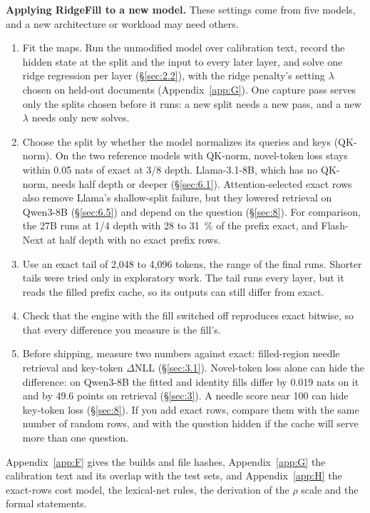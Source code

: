 \documentclass[11pt]{article}
\begin{document}
\textbf{Applying RidgeFill to a new model.} These settings come from five models, and a new architecture or workload may need others.

\begin{enumerate}[leftmargin=*,itemsep=2pt,topsep=4pt]
\item Fit the maps. Run the unmodified model over calibration text, record the hidden state at the split and the input to every later layer, and solve one ridge regression per layer (\S\ref{sec:2.2}), with the ridge penalty's setting $\lambda$ chosen on held-out documents (Appendix~\ref{app:G}). One capture pass serves only the splits chosen before it runs: a new split needs a new pass, and a new $\lambda$ needs only new solves.
\item Choose the split by whether the model normalizes its queries and keys (QK-norm). On the two reference models with QK-norm, novel-token loss stays within 0.05 nats of exact at 3/8 depth. Llama-3.1-8B, which has no QK-norm, needs half depth or deeper (\S\ref{sec:6.1}). Attention-selected exact rows also remove Llama's shallow-split failure, but they lowered retrieval on Qwen3-8B (\S\ref{sec:6.5}) and depend on the question (\S\ref{sec:8}). For comparison, the 27B runs at 1/4 depth with 28 to 31~\% of the prefix exact, and Flash-Next at half depth with no exact prefix rows.
\item Use an exact tail of 2,048 to 4,096 tokens, the range of the final runs. Shorter tails were tried only in exploratory work. The tail runs every layer, but it reads the filled prefix cache, so its outputs can still differ from exact.
\item Check that the engine with the fill switched off reproduces exact bitwise, so that every difference you measure is the fill's.
\item Before shipping, measure two numbers against exact: filled-region needle retrieval and key-token $\Delta$NLL (\S\ref{sec:3.1}). Novel-token loss alone can hide the difference: on Qwen3-8B the fitted and identity fills differ by 0.019 nats on it and by 49.6 points on retrieval (\S\ref{sec:3}). A needle score near 100 can hide key-token loss (\S\ref{sec:8}). If you add exact rows, compare them with the same number of random rows, and with the question hidden if the cache will serve more than one question.
\end{enumerate}

Appendix~\ref{app:F} gives the builds and file hashes, Appendix~\ref{app:G} the calibration text and its overlap with the test sets, and Appendix~\ref{app:H} the exact-rows cost model, the lexical-net rules, the derivation of the $\rho$ scale and the formal statements.
\end{document}
